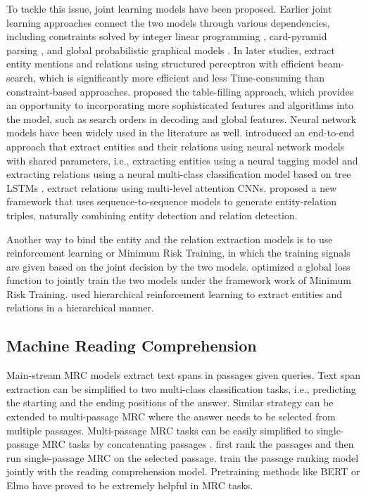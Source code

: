 \documentclass[11pt,a4paper]{article}
\begin{document}
To tackle this issue,
 joint learning models have been proposed. 
Earlier joint learning approaches
connect the two models through various dependencies, including 
constraints solved by integer linear programming \cite{yang2013joint,roth2007global}, card-pyramid parsing \cite{kate2010joint}, and global probabilistic graphical models \cite{yu2010jointly,singh2013joint}. 
In later studies,  
extract entity mentions and relations using structured perceptron with efficient beam-search, which is significantly more efficient and less Time-consuming than constraint-based approaches. 
proposed the  table-filling approach,
which provides an opportunity to incorporating 
more sophisticated features and algorithms into the model, such as search orders in decoding and global features.
Neural network models have been widely used in the literature as well.  introduced an end-to-end approach that extract entities and their relations using neural network models with shared parameters, i.e., extracting entities using a neural tagging model and extracting relations using a neural multi-class classification model based on tree LSTMs \cite{tai2015improved}.  
 extract relations using multi-level attention CNNs. 
 proposed a new framework that uses sequence-to-sequence models to generate entity-relation triples, naturally combining entity detection and relation detection. 

Another way to bind the entity and the relation extraction models is to use reinforcement learning or Minimum Risk Training, in which the training signals are given based on the joint decision by the two models.   
 optimized a global loss function to jointly train the two models under the framework work of Minimum Risk Training.  used hierarchical reinforcement learning to extract entities and relations in a hierarchical manner. 

\subsection{Machine Reading Comprehension}
Main-stream MRC models \cite{seo2016bidirectional,wang2016machine,xiong2017dcn,wang2016multi}
 extract text spans in passages given queries. Text span extraction can be simplified to two multi-class classification tasks, i.e., predicting the starting and the ending positions of the answer.  
Similar strategy can be extended to multi-passage MRC \cite{joshi2017triviaqa,dunn2017searchqa} 
 where the answer needs to be selected from multiple passages.
Multi-passage MRC tasks can be easily simplified to single-passage MRC tasks by concatenating passages 
\cite{shen2017reasonet,wang2017gated}. 
first rank the passages and then run single-passage MRC on the selected passage. 
 train the passage ranking model jointly with the reading comprehension model. 
Pretraining methods like BERT \cite{devlin2018bert} or Elmo \cite{peters2018deep} have proved to be extremely helpful in MRC tasks. 
\end{document}
